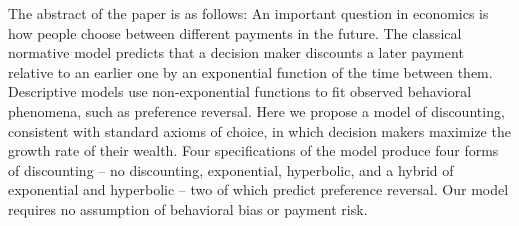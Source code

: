 The abstract of the paper is as follows: An important question in economics is how people choose between different payments in the future. The classical normative model predicts that a decision maker discounts a later payment relative to an earlier one by an exponential function of the time between them. Descriptive models use non-exponential functions to fit observed behavioral phenomena, such as preference reversal. Here we propose a model of discounting, consistent with standard axioms of choice, in which decision makers maximize the growth rate of their wealth. Four specifications of the model produce four forms of discounting -- no discounting, exponential, hyperbolic, and a hybrid of exponential and hyperbolic -- two of which predict preference reversal. Our model requires no assumption of behavioral bias or payment risk.










